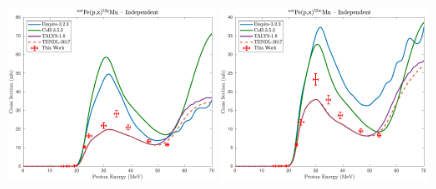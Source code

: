 \begin{figure}
 \includegraphics[width=0.49\textwidth]{./figures/52gMn.pdf}
 \includegraphics[width=0.49\textwidth]{./figures/52mMn.pdf}

\vspace{-20pt} 
\end{figure}





